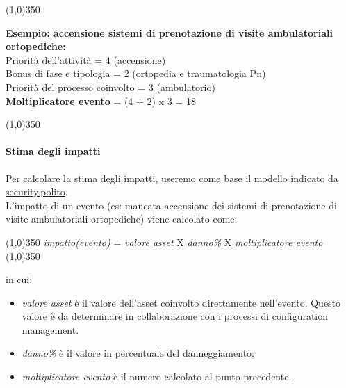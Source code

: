 \begin{center}
	\line(1,0){350}
\end{center}
\begin{changemargin}{0.5cm}{0.5cm}
  \textbf{Esempio: accensione sistemi di prenotazione di visite ambulatoriali ortopediche:}\\
  Priorità dell'attività = 4 (accensione)\\
  Bonus di fase e tipologia = 2 (ortopedia e traumatologia Pn)\\
  Priorità del processo coinvolto = 3 (ambulatorio)\\
  \textbf{Moltiplicatore evento} = (4 + 2) x 3 = 18
\end{changemargin}
\begin{center}
	\line(1,0){350}
\end{center}

\paragraph{Stima degli impatti}
Per calcolare la stima degli impatti, useremo come base il modello indicato da \href{http://security.polito.it/~lioy/01jem/risk05_risk_2x.pdf}{security.polito}.\\
L'impatto di un evento (es: mancata accensione dei sistemi di prenotazione di visite ambulatoriali ortopediche) viene calcolato come:
\\
\begin{center}
	\line(1,0){350}
    \vspace{0,1cm}
\textit{impatto(evento)} = \textit{valore asset} X \textit{danno\%} X \textit{moltiplicatore evento}
	\line(1,0){350}
\end{center}
in cui:
\begin{itemize}
\item \textit{valore asset} è il valore dell'asset coinvolto direttamente nell'evento. Questo valore è da determinare in collaborazione con i processi di configuration management.
\item \textit{danno\%} è il valore in percentuale del danneggiamento;
\item \textit{moltiplicatore evento} è il numero calcolato al punto precedente.
\end{itemize}

